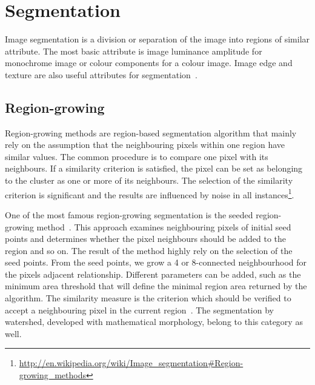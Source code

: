 



\section{Segmentation} %
\label{sub:ap:segmentation}
Image segmentation is a division or separation of the image into regions of similar attribute.
The most basic attribute is image luminance amplitude for monochrome image or colour components for a colour image.
Image edge and texture are also useful attributes for segmentation~\cite{Pratt2007Digital}.

\subsection{Region-growing} %
\label{sub:ap:region_growing}
Region-growing methods are region-based segmentation algorithm that mainly rely on the assumption that the neighbouring pixels within one region have similar values.
The common procedure is to compare one pixel with its neighbours.
If a similarity criterion is satisfied, the pixel can be set as belonging to the cluster as one or more of its neighbours.
The selection of the similarity criterion is significant and the results are influenced by noise in all instances\footnote{\url{http://en.wikipedia.org/wiki/Image_segmentation\#Region-growing_methods}}.

One of the most famous region-growing segmentation is the seeded region-growing method~\cite{adams1994seeded,mehnert1997improved}.
This approach examines neighbouring pixels of initial seed points and determines whether the pixel neighbours should be added to the region and so on.
The result of the method highly rely on the selection of the seed points.
From the seed points, we grow a 4 or 8-connected neighbourhood for the pixels adjacent relationship.
Different parameters can be added, such as the minimum area threshold that will define the minimal region area returned by the algorithm.
The similarity measure is the criterion which should be verified to accept a neighbouring pixel in the current region~\cite{Gonzalez1992Digital}.
The segmentation by watershed, developed with mathematical morphology, belong to this category as well.

